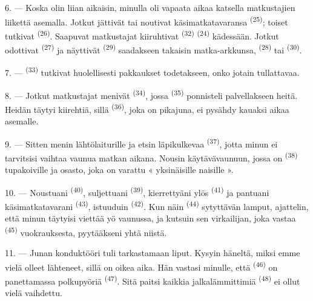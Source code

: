 6. --- Koska olin liian aikaisin, minulla oli vapaata aikaa katsella
matkustajien liikettä asemalla. Jotkut jättivät tai noutivat käsimatkatavaransa
 \textsuperscript{(25)}; toiset tutkivat
 \textsuperscript{(26)}. Saapuvat matkustajat kiiruhtivat
 \textsuperscript{(32)} 
\textsuperscript{(24)} kädessään. Jotkut odottivat
 \textsuperscript{(27)} ja näyttivät
 \textsuperscript{(29)} saadakseen takaisin matka-arkkunsa,
 \textsuperscript{(28)} tai 
\textsuperscript{(30)}.

7. ---  \textsuperscript{(33)} tutkivat huolellisesti
pakkaukset todetakseen, onko jotain tullattavaa.

8. --- Jotkut matkustajat menivät  \textsuperscript{(34)},
jossa  \textsuperscript{(35)} ponnisteli palvellakseen heitä.
Heidän täytyi kiirehtiä, sillä  \textsuperscript{(36)}, joka on
pikajuna, ei pysähdy kauaksi aikaa asemalle.

9. --- Sitten menin lähtölaiturille ja etsin läpikulkevaa 
\textsuperscript{(37)}, jotta minun ei tarvitsisi vaihtaa vaunua matkan aikana.
Nousin käytävävaunuun, jossa on  \textsuperscript{(38)}
tupakoiville ja osasto, joka on varattu « yksinäisille naisille ».

\VUsaut{3.0mm}

10. --- Noustuani  \textsuperscript{(40)}, suljettuani
 \textsuperscript{(39)}, kierrettyäni ylös 
\textsuperscript{(41)} ja pantuani käsimatkatavarani 
\textsuperscript{(43)}, istuuduin  \textsuperscript{(42)}.
Kun näin  \textsuperscript{(44)} sytyttävän lamput,
ajattelin, että minun täytyisi viettää yö vaunussa, ja kutsuin sen virkailijan,
joka vastaa  \textsuperscript{(45)} vuokrauksesta,
pyytääkseni yhtä niistä.

11. --- Junan konduktööri tuli tarkastamaan liput. Kysyin häneltä, miksi emme
vielä olleet lähteneet, sillä on oikea aika. Hän vastasi minulle, että
 \textsuperscript{(46)} on panettamassa polkupyöriä
 \textsuperscript{(47)}. Sitä paitsi kaikkia
jalkalämmittimiä \textsuperscript{(48)} ei ollut vielä vaihdettu.

